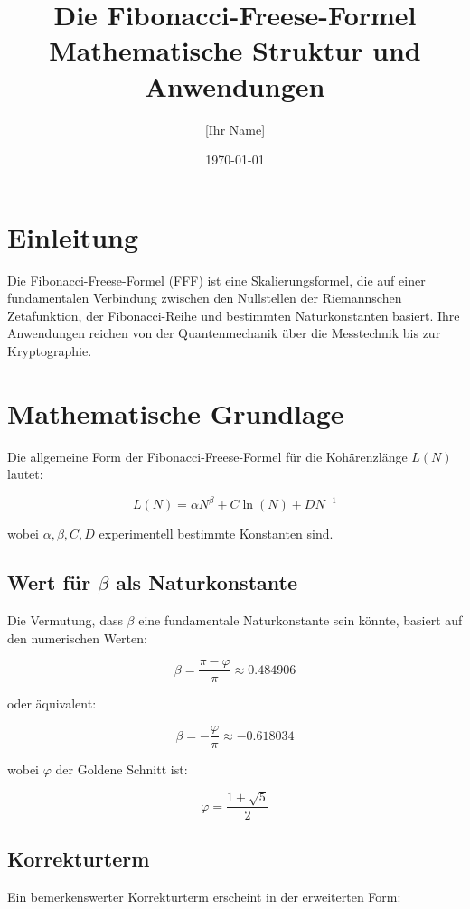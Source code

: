 \documentclass[a4paper,12pt]{article}
\title{Die Fibonacci-Freese-Formel \\ Mathematische Struktur und Anwendungen}
\author{[Ihr Name]}
\date{\today}
\begin{document}
\maketitle

\section{Einleitung}

Die Fibonacci-Freese-Formel (FFF) ist eine Skalierungsformel, die auf einer fundamentalen Verbindung zwischen den Nullstellen der Riemannschen Zetafunktion, der Fibonacci-Reihe und bestimmten Naturkonstanten basiert. Ihre Anwendungen reichen von der Quantenmechanik über die Messtechnik bis zur Kryptographie.

\section{Mathematische Grundlage}

Die allgemeine Form der Fibonacci-Freese-Formel für die Kohärenzlänge $L(N)$ lautet:

\begin{equation}
    L(N) = \alpha N^\beta + C \ln(N) + D N^{-1}
\end{equation}

wobei $\alpha, \beta, C, D$ experimentell bestimmte Konstanten sind.

\subsection{Wert für $\beta$ als Naturkonstante}
Die Vermutung, dass $\beta$ eine fundamentale Naturkonstante sein könnte, basiert auf den numerischen Werten:

\begin{equation}
    \beta = \frac{\pi - \varphi}{\pi} \approx 0.484906
\end{equation}

oder äquivalent:

\begin{equation}
    \beta = -\frac{\varphi}{\pi} \approx -0.618034
\end{equation}

wobei $\varphi$ der Goldene Schnitt ist:

\begin{equation}
    \varphi = \frac{1+\sqrt{5}}{2}
\end{equation}

\subsection{Korrekturterm}
Ein bemerkenswerter Korrekturterm erscheint in der erweiterten Form:
\end{document}
